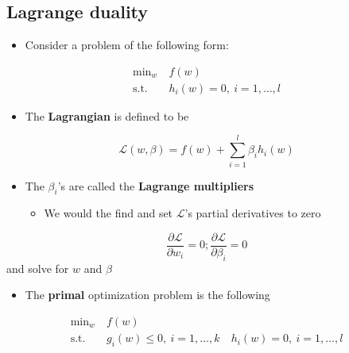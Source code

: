 \documentclass[11pt]{article}
\begin{document}
\subsection{Lagrange duality}
\label{sec:org851c9bd}
\begin{itemize}
\item Consider a problem of the following form:
\end{itemize}
\begin{equation}
  \begin{split} 
    \text{min}_w &\ f(w)  \\
    \text{s.t.} &\ h_i(w) = 0, \ i=1,\dots,l
  \end{split}
\end{equation}
\begin{itemize}
\item The \textbf{Lagrangian} is defined to be
\end{itemize}
\begin{equation}
  \mathcal L(w,\beta) = f(w) + \sum_{i=1}^l\beta_ih_i(w)
\end{equation}
\begin{itemize}
\item The \(\beta_i\)'s are called the \textbf{Lagrange multipliers}
\begin{itemize}
\item We would the find and set \(\mathcal L\)'s partial derivatives to zero
\end{itemize}
\end{itemize}
\begin{equation}
  \frac{\partial \mathcal L}{\partial w_i} = 0; \frac{\partial \mathcal L}{\partial \beta_i} = 0
\end{equation}
and solve for \(w\) and \(\beta\) 

\begin{itemize}
\item The \textbf{primal} optimization problem is the following
\end{itemize}
\begin{equation}
  \begin{split} 
    \text{min}_w &\ f(w)  \\
    \text{s.t.} &\ g_i(w) \leq 0, \ i=1,\dots, k
								&\ h_i(w) = 0, \ i=1,\dots,l
  \end{split}
\end{equation}
\end{document}
